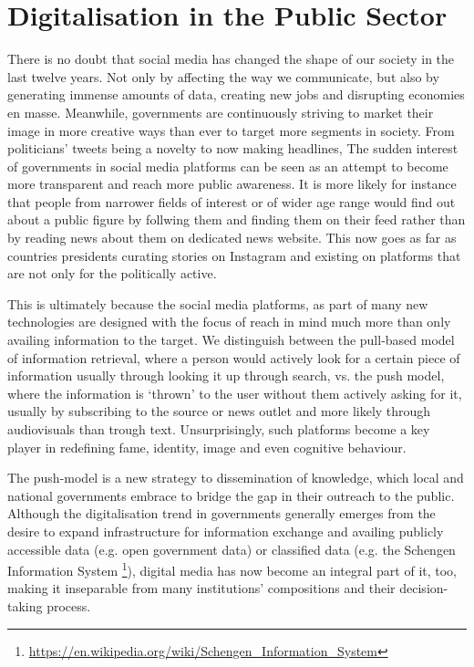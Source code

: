 \section{Digitalisation in the Public Sector}

There is no doubt that social media has changed the shape of our society in the last twelve years. Not only by affecting the way we communicate, but also by generating immense amounts of data, creating new jobs and disrupting economies en masse.
Meanwhile, governments are continuously striving to market their image in more creative ways than ever to target more segments in society. From politicians' tweets being a novelty to now making headlines, The sudden interest of governments in social media platforms 
can be seen as an attempt to become more transparent and reach more public awareness. It is more likely for instance that people from narrower fields of interest or of wider age range
would find out about a public figure by follwing them and finding them on their feed
rather than by reading news about them on dedicated news website.
This now goes as far as countries presidents curating stories on Instagram and existing on platforms that are not only for the politically active.


This is ultimately because the social media platforms, as part of many new technologies are designed with the focus of reach in mind much more than only availing information to the target.
We distinguish between the pull-based model of information retrieval, where a person would actively look for a certain piece of information usually through looking it up through search, vs. the push model, where the information is `thrown' to the user without them actively asking for it, usually by subscribing to the source or news outlet and more likely through audiovisuals than trough text. Unsurprisingly, such platforms become a key player in redefining fame, identity, image and even cognitive behaviour.

The push-model is a new strategy to dissemination of knowledge, which local and national governments %
embrace \cite{forbes:govOutreach} to bridge the gap in their outreach to the public. 
Although the digitalisation trend in governments generally emerges from the desire to expand infrastructure for information exchange and availing publicly accessible data (e.g. open government data) \cite{un:egovReport} or classified data (e.g. the Schengen Information System \footnote{\url{https://en.wikipedia.org/wiki/Schengen_Information_System}}), digital media has now become an integral part of it, too, making it inseparable from many institutions' compositions and their decision-taking process. 

